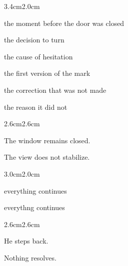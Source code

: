 \begin{adjustwidth}{3.4cm}{2.0cm}

\noindent the moment before the door was closed

\noindent the decision to turn

\noindent the cause of hesitation

\noindent {}

\noindent the first version of the mark

\noindent the correction that was not made

\noindent {}

\noindent the reason it did not

\vspace{1em}

\noindent {}

\noindent {}

\vspace{2em}

\end{adjustwidth}

\begin{adjustwidth}{2.6cm}{2.6cm}

The window remains closed.

\vspace{1em}

The view does not stabilize.

\vspace{2em}

\end{adjustwidth}

\begin{adjustwidth}{3.0cm}{2.0cm}

\noindent {}

\vspace{1em}

everything continues

\vspace{1em}

everythng continues

\vspace{2em}

\end{adjustwidth}

\begin{adjustwidth}{2.6cm}{2.6cm}

He steps back.

\vspace{1em}

Nothing resolves.

\vspace{2em}

\end{adjustwidth}

